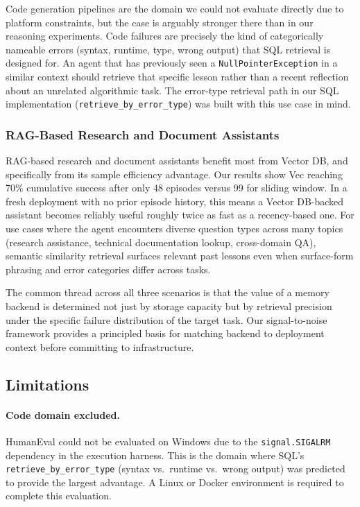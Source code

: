\documentclass{article}
\begin{document}
Code generation pipelines are the domain we could not evaluate directly
due to platform constraints, but the case is arguably stronger there than
in our reasoning experiments. Code failures are precisely the kind of
categorically nameable errors (syntax, runtime, type, wrong output) that
SQL retrieval is designed for. An agent that has previously seen a
\texttt{NullPointerException} in a similar context should retrieve that
specific lesson rather than a recent reflection about an unrelated
algorithmic task. The error-type retrieval path in our SQL implementation
(\texttt{retrieve\_by\_error\_type}) was built with this use case in mind.

\subsubsection*{RAG-Based Research and Document Assistants}

RAG-based research and document assistants benefit most from Vector DB,
and specifically from its sample efficiency advantage. Our results show
Vec reaching 70\% cumulative success after only 48 episodes versus 99 for
sliding window. In a fresh deployment with no prior episode history, this
means a Vector DB-backed assistant becomes reliably useful roughly twice
as fast as a recency-based one. For use cases where the agent encounters
diverse question types across many topics (research assistance, technical
documentation lookup, cross-domain QA), semantic similarity retrieval
surfaces relevant past lessons even when surface-form phrasing and error
categories differ across tasks.

The common thread across all three scenarios is that the value of a
memory backend is determined not just by storage capacity but by retrieval
precision under the specific failure distribution of the target task. Our
signal-to-noise framework provides a principled basis for matching backend
to deployment context before committing to infrastructure.

\subsection{Limitations}

\paragraph{Code domain excluded.}
HumanEval \citep{chen2021humaneval} could not be evaluated on Windows due
to the \texttt{signal.SIGALRM} dependency in the execution harness. This
is the domain where SQL's \texttt{retrieve\_by\_error\_type} (syntax
vs.\ runtime vs.\ wrong output) was predicted to provide the largest
advantage. A Linux or Docker environment is required to complete this
evaluation.
\end{document}
